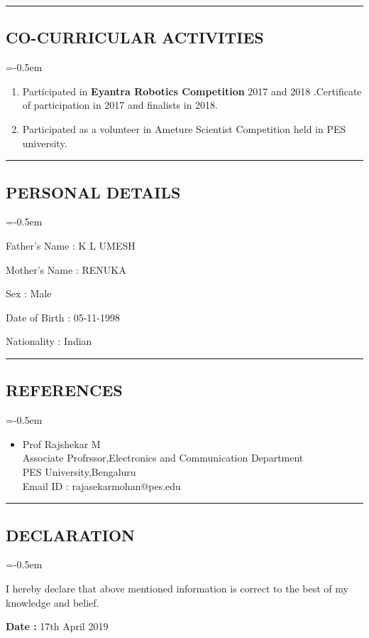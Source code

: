 \documentclass[10pt,letterpaper]{article}
\begin{document}
\hrule
\subsection*{CO-CURRICULAR ACTIVITIES}
\parskip=-0.5em

\begin{enumerate}

	\item Participated in \textbf{Eyantra Robotics Competition } 2017 and 2018 .Certificate of participation in 2017 and finalists in 2018.
	\item Participated as a volunteer in Ameture Scientist Competition held in PES university.

\end{enumerate}

\pagebreak
\hrule
\subsection*{PERSONAL DETAILS}
\parskip=-0.5em

\begin{description}

\item Father's Name : K L UMESH 
\item Mother's Name : RENUKA 
\item Sex : Male 
\item Date of Birth : 05-11-1998
\item Nationality : Indian

\end{description}

\hrule
\subsection*{REFERENCES}
\parskip=-0.5em

\begin{itemize} 

\item Prof Rajshekar M\\Associate Profrssor,Electronics and Communication Department\\PES University,Bengaluru\\Email ID : rajasekarmohan@pes.edu\\

\end{itemize}

\hrule
\subsection*{DECLARATION}
\parskip=-0.5em

\begin{description}

\item I hereby declare that above mentioned information is correct to the best of my knowledge and belief.

\end{description}

\vspace{2.0em}

\textbf{Date : }17th April 2019
\end{document}
